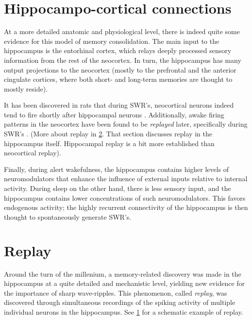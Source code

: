 \section{Hippocampo-cortical connections}
\label{sec:HC-neocortex}

At a more detailed anatomic and physiological level, there is indeed quite some evidence for this model of memory consolidation. The main input to the hippocampus is the entorhinal cortex, which relays deeply processed sensory information from the rest of the neocortex. In turn, the hippocampus has many output projections to the neocortex (mostly to the prefrontal and the anterior cingulate cortices, where both short- and long-term memories are thought to mostly reside).

It has been discovered in rats that during SWR's, neocortical neurons indeed tend to fire shortly after hippocampal neurons \cite{Wierzynski2009}. Additionally, awake firing patterns in the neocortex have been found to be \emph{replayed} later, specifically during SWR's \cite{Peyrache2009}. (More about replay in \cref{sec:replay}. That section discusses replay in the hippocampus itself. Hippocampal replay is a bit more established than neocortical replay).

Finally, during alert wakefulness, the hippocampus contains higher levels of neuromodulators that enhance the influence of external inputs relative to internal activity. During sleep on the other hand, there is less sensory input, and the hippocampus contains lower concentrations of such neuromodulators. This favors endogenous activity; the highly recurrent connectivity of the hippocampus is then thought to spontaneously generate SWR's.




\begin{figure}
\label{fig:replay}
\end{figure}

\section{Replay}
\label{sec:replay}

Around the turn of the millenium, a memory-related discovery was made in the hippocampus at a quite detailed and mechanistic level, yielding new evidence for the importance of sharp wave-ripples. This phenomenon, called \emph{replay}, was discovered through simultaneous recordings of the spiking activity of multiple individual neurons in the hippocampus.\footnotemark{} See \cref{fig:replay} for a schematic example of replay.

